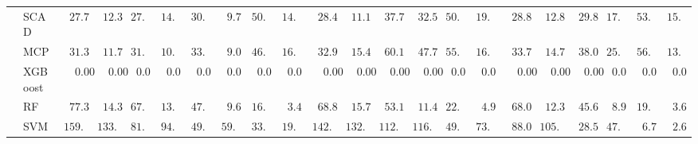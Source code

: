 \begin{tabular}{llllllllllllllllllllll}
	& SCAD  & $\phantom{0}27.77$ & $\phantom{0}12.34$ & $27.82$ & $14.35$ & $30.26$ & $\phantom{0}9.76$ & $50.65$ & $14.71$ & $\phantom{0}28.49$ & $\phantom{0}11.19$ & $\phantom{0}37.71$ & $\phantom{0}32.58$ & $50.22$ & $19.72$ & $\phantom{0}28.88$ & $\phantom{0}12.84$ & $\phantom{0}29.80$ & $17.22$ & $53.75$ & $15.75$ \\
	& MCP  & $\phantom{0}31.37$ & $\phantom{0}11.71$ & $31.72$ & $10.98$ & $33.72$ & $\phantom{0}9.00$ & $46.51$ & $16.00$ & $\phantom{0}32.96$ & $\phantom{0}15.41$ & $\phantom{0}60.14$ & $\phantom{0}47.76$ & $55.20$ & $16.70$ & $\phantom{0}33.78$ & $\phantom{0}14.76$ & $\phantom{0}38.07$ & $25.28$ & $56.70$ & $13.61$ \\
	& XGBoost  & $\phantom{00}0.00$ & $\phantom{00}0.00$ & $\phantom{0}0.00$ & $\phantom{0}0.00$ & $\phantom{0}0.00$ & $\phantom{0}0.00$ & $\phantom{0}0.00$ & $\phantom{0}0.00$ & $\phantom{00}0.00$ & $\phantom{00}0.00$ & $\phantom{00}0.00$ & $\phantom{00}0.00$ & $\phantom{0}0.00$ & $\phantom{0}0.00$ & $\phantom{00}0.00$ & $\phantom{00}0.00$ & $\phantom{00}0.00$ & $\phantom{0}0.00$ & $\phantom{0}0.00$ & $\phantom{0}0.00$ \\
	& RF  & $\phantom{0}77.31$ & $\phantom{0}14.37$ & $67.78$ & $13.35$ & $47.85$ & $\phantom{0}9.60$ & $16.38$ & $\phantom{0}3.44$ & $\phantom{0}68.81$ & $\phantom{0}15.73$ & $\phantom{0}53.11$ & $\phantom{0}11.43$ & $22.23$ & $\phantom{0}4.96$ & $\phantom{0}68.02$ & $\phantom{0}12.31$ & $\phantom{0}45.69$ & $\phantom{0}8.92$ & $19.15$ & $\phantom{0}3.69$ \\
	& SVM  & $159.93$ & $133.99$ & $81.76$ & $94.03$ & $49.00$ & $59.08$ & $33.34$ & $19.99$ & $142.86$ & $132.04$ & $112.23$ & $116.37$ & $49.15$ & $73.90$ & $\phantom{0}88.08$ & $105.63$ & $\phantom{0}28.52$ & $47.94$ & $\phantom{0}6.74$ & $\phantom{0}2.65$ \\
	\hline 
\end{tabular}